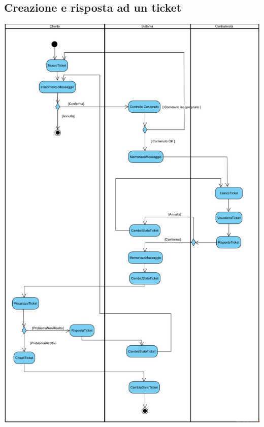 \documentclass[12pt]{article}
\begin{document}
\subsection{Creazione e risposta ad un ticket}
\begin{center}
\includegraphics[width=\textwidth]{ActivityDiagram/Ticket}
\end{center}
\end{document}
